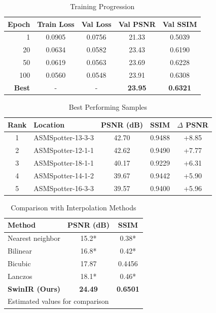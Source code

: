 \begin{table}[h]
\centering
\caption{Training Progression}
\label{tab:training_progress}
\begin{tabular}{rcccc}
\toprule
\textbf{Epoch} & \textbf{Train Loss} & \textbf{Val Loss} & \textbf{Val PSNR} & \textbf{Val SSIM} \\
\midrule
1 & 0.0905 & 0.0756 & 21.33 & 0.5039 \\
20 & 0.0634 & 0.0582 & 23.43 & 0.6190 \\
50 & 0.0619 & 0.0563 & 23.69 & 0.6228 \\
100 & 0.0560 & 0.0548 & 23.91 & 0.6308 \\
\midrule
\textbf{Best} & - & - & \textbf{23.95} & \textbf{0.6321} \\
\bottomrule
\end{tabular}
\end{table}

\begin{table}[h]
\centering
\caption{Best Performing Samples}
\label{tab:best}
\begin{tabular}{clccc}
\toprule
\textbf{Rank} & \textbf{Location} & \textbf{PSNR (dB)} & \textbf{SSIM} & \textbf{$\Delta$ PSNR} \\
\midrule
1 & ASMSpotter-13-3-3 & 42.70 & 0.9488 & +8.85 \\
2 & ASMSpotter-12-1-1 & 42.62 & 0.9490 & +7.77 \\
3 & ASMSpotter-18-1-1 & 40.17 & 0.9229 & +6.31 \\
4 & ASMSpotter-14-1-2 & 39.67 & 0.9442 & +5.90 \\
5 & ASMSpotter-16-3-3 & 39.57 & 0.9400 & +5.96 \\
\bottomrule
\end{tabular}
\end{table}

\begin{table}[h]
\centering
\caption{Comparison with Interpolation Methods}
\label{tab:comparison}
\begin{tabular}{lcc}
\toprule
\textbf{Method} & \textbf{PSNR (dB)} & \textbf{SSIM} \\
\midrule
Nearest neighbor & 15.2* & 0.38* \\
Bilinear & 16.8* & 0.42* \\
Bicubic & 17.87 & 0.4456 \\
Lanczos & 18.1* & 0.46* \\
\midrule
\textbf{SwinIR (Ours)} & \textbf{24.49} & \textbf{0.6501} \\
\bottomrule
\multicolumn{3}{l}{\footnotesize *Estimated values for comparison} \\
\end{tabular}
\end{table}

